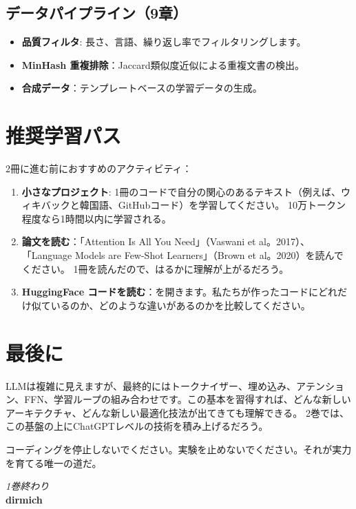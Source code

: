 \subsection{データパイプライン（9章）}

\begin{itemize}
\item\textbf{品質フィルタ}: 長さ、言語、繰り返し率でフィルタリングします。
\item\textbf{MinHash 重複排除}：Jaccard類似度近似による重複文書の検出。
\item\textbf{合成データ}：テンプレートベースの学習データの生成。
\end{itemize}

\section{推奨学習パス}

2冊に進む前におすすめのアクティビティ：

\begin{enumerate}
\item\textbf{小さなプロジェクト}: 1冊のコードで自分の関心のあるテキスト（例えば、ウィキバックと韓国語、GitHubコード）を学習してください。 10万トークン程度なら1時間以内に学習される。
\item\textbf{論文を読む}：「Attention Is All You Need」（Vaswani et al。2017）、「Language Models are Few-Shot Learners」（Brown et al。2020）を読んでください。 1冊を読んだので、はるかに理解が上がるだろう。
\item\textbf{HuggingFace コードを読む}：を開きます。私たちが作ったコードにどれだけ似ているのか、どのような違いがあるのか​​を比較してください。
\end{enumerate}

\section{最後に}

LLMは複雑に見えますが、最終的にはトークナイザー、埋め込み、アテンション、FFN、学習ループの組み合わせです。この基本を習得すれば、どんな新しいアーキテクチャ、どんな新しい最適化技法が出てきても理解できる。 2巻では、この基盤の上にChatGPTレベルの技術を積み上げるだろう。

コーディングを停止しないでください。実験を止めないでください。それが実力を育てる唯一の道だ。

\begin{flushright}
\textit{1巻終わり}\\[0.5em]
\textbf{dirmich}
\end{flushright}
